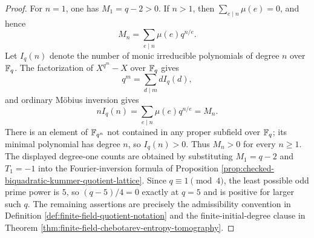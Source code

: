 \begin{proof}
For \(n=1\), one has \(M_1=q-2>0\).  If \(n>1\), then \(\sum_{e\mid n}\mu(e)=0\), and hence
\[
M_n=\sum_{e\mid n}\mu(e)q^{n/e}.
\]
Let \(I_q(n)\) denote the number of monic irreducible polynomials of degree \(n\) over \(\mathbb{F}_q\).  The factorization of \(X^{q^m}-X\) over \(\mathbb{F}_q\) gives
\[
q^m=\sum_{d\mid m}dI_q(d),
\]
and ordinary M\"obius inversion gives
\[
nI_q(n)=\sum_{e\mid n}\mu(e)q^{n/e}=M_n.
\]
There is an element of \(\mathbb{F}_{q^n}\) not contained in any proper subfield over \(\mathbb{F}_q\); its minimal polynomial has degree \(n\), so \(I_q(n)>0\).  Thus \(M_n>0\) for every \(n\ge1\).  The displayed degree-one counts are obtained by substituting \(M_1=q-2\) and \(T_1=-1\) into the Fourier-inversion formula of Proposition \ref{prop:checked-biquadratic-kummer-quotient-lattice}.  Since \(q\equiv1\pmod4\), the least possible odd prime power is \(5\), so \((q-5)/4=0\) exactly at \(q=5\) and is positive for larger such \(q\).  The remaining assertions are precisely the admissibility convention in Definition \ref{def:finite-field-quotient-notation} and the finite-initial-degree clause in Theorem \ref{thm:finite-field-chebotarev-entropy-tomography}.
\end{proof}

